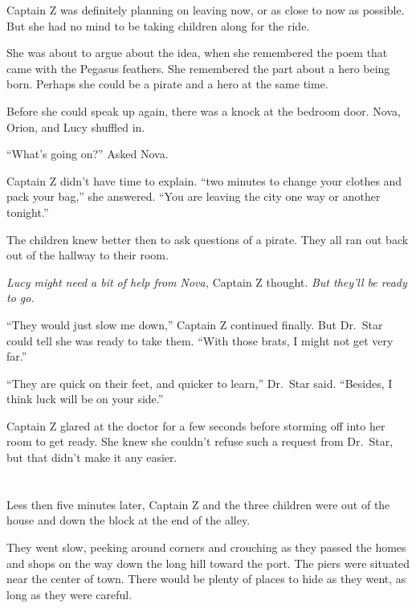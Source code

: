 \documentclass[12pt]{extbook}
\begin{document}
  Captain Z was definitely planning on leaving now, or as close to now as
  possible. But she had no mind to be taking children along for the ride.
  
  She was about to argue about the idea, when she remembered the poem that
  came with the Pegasus feathers. She remembered the part about a hero
  being born. Perhaps she could be a pirate and a hero at the same time.
  
  Before she could speak up again, there was a knock at the bedroom door.
  Nova, Orion, and Lucy shuffled in.
  
  \enquote{What's going on?} Asked Nova.
  
  Captain Z didn't have time to explain. \enquote{two minutes to change
  your clothes and pack your bag,} she answered. \enquote{You are leaving
  the city one way or another tonight.}
  
  The children knew better then to ask questions of a pirate. They all ran
  out back out of the hallway to their room.
  
  \emph{Lucy might need a bit of help from Nova,} Captain Z thought.
  \emph{But they'll be ready to go.}
  
  \enquote{They would just slow me down,} Captain Z continued finally. But
  Dr.~Star could tell she was ready to take them. \enquote{With those
  brats, I might not get very far.}
  
  \enquote{They are quick on their feet, and quicker to learn,} Dr.~Star
  said. \enquote{Besides, I think luck will be on your side.}
  
  Captain Z glared at the doctor for a few seconds before storming off
  into her room to get ready. She knew she couldn't refuse such a request
  from Dr.~Star, but that didn't make it any easier.
  
  \section{}\label{section-33}
  
  Less then five minutes later, Captain Z and the three children were out
  of the house and down the block at the end of the alley.
  
  They went slow, peeking around corners and crouching as they passed the
  homes and shops on the way down the long hill toward the port. The piers
  were situated near the center of town. There would be plenty of places
  to hide as they went, as long as they were careful.
  
\end{document}
